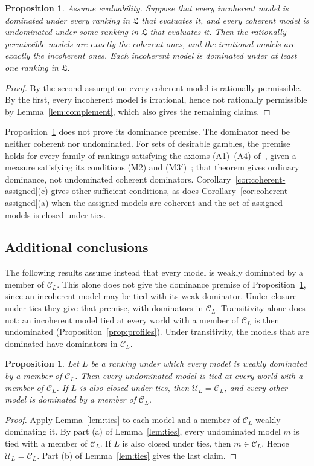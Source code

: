 \documentclass[11pt]{article}
\newtheorem{proposition}[theorem]{Proposition}
\theoremstyle{definition}
\newcommand{\C}{\mathcal C}
\newcommand{\U}{\mathcal U}
\newcommand{\Lf}{\mathfrak L}
\begin{document}
\begin{proposition}\label{prop:family}
Assume evaluability. Suppose that every incoherent model is dominated under every ranking in $\Lf$ that evaluates it, and every coherent model is undominated under some ranking in $\Lf$ that evaluates it. Then the rationally permissible models are exactly the coherent ones, and the irrational models are exactly the incoherent ones. Each incoherent model is dominated under at least one ranking in $\Lf$.
\end{proposition}
\begin{proof}
By the second assumption every coherent model is rationally permissible. By the first, every incoherent model is irrational, hence not rationally permissible by Lemma~\ref{lem:complement}, which also gives the remaining claims.
\end{proof}

Proposition~\ref{prop:family} does not prove its dominance premise. The dominator need be neither coherent nor undominated. For sets of desirable gambles, the premise holds for every family of rankings satisfying the axioms (A1)--(A4) of~\cite{KCM}, given a measure satisfying its conditions (M2) and (M3$'$)~\cite[Theorem~4.1]{KCM}; that theorem gives ordinary dominance, not undominated coherent dominators. Corollary~\ref{cor:coherent-assigned}(c) gives other sufficient conditions, as does Corollary~\ref{cor:coherent-assigned}(a) when the assigned models are coherent and the set of assigned models is closed under ties.

\subsection{Additional conclusions}
The following results assume instead that every model is weakly dominated by a member of $\C_L$. This alone does not give the dominance premise of Proposition~\ref{prop:family}, since an incoherent model may be tied with its weak dominator. Under closure under ties they give that premise, with dominators in $\C_L$. Transitivity alone does not: an incoherent model tied at every world with a member of $\C_L$ is then undominated (Proposition~\ref{prop:profiles}). Under transitivity, the models that are dominated have dominators in $\C_L$.

\begin{proposition}\label{prop:conclusion}
Let $L$ be a ranking under which every model is weakly dominated by a member of $\C_L$. Then every undominated model is tied at every world with a member of $\C_L$. If $L$ is also closed under ties, then $\U_L=\C_L$, and every other model is dominated by a member of $\C_L$.
\end{proposition}
\begin{proof}
Apply Lemma~\ref{lem:ties} to each model and a member of $\C_L$ weakly dominating it. By part (a) of Lemma~\ref{lem:ties}, every undominated model $m$ is tied with a member of $\C_L$. If $L$ is also closed under ties, then $m\in\C_L$. Hence $\U_L=\C_L$. Part (b) of Lemma~\ref{lem:ties} gives the last claim.
\end{proof}
\end{document}
